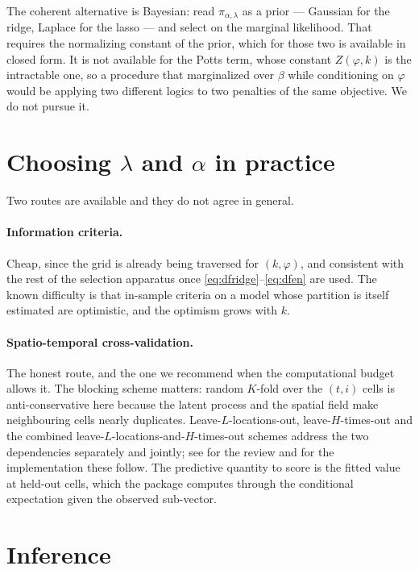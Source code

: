 \documentclass[11pt,a4paper]{article}
\begin{document}
The coherent alternative is Bayesian: read $\pi_{\alpha,\lambda}$ as a prior ---
Gaussian for the ridge, Laplace for the lasso --- and select on the marginal
likelihood. That requires the normalizing constant of the prior, which for
those two is available in closed form. It is not available for the Potts term,
whose constant $Z(\varphi,k)$ is the intractable one, so a procedure that
marginalized over $\beta$ while conditioning on $\varphi$ would be applying two
different logics to two penalties of the same objective. We do not pursue it.

\section{Choosing $\lambda$ and $\alpha$ in practice}

Two routes are available and they do not agree in general.

\paragraph{Information criteria.} Cheap, since the grid is already being
traversed for $(k,\varphi)$, and consistent with the rest of the selection
apparatus once \eqref{eq:dfridge}--\eqref{eq:dfen} are used. The known
difficulty is that in-sample criteria on a model whose partition is itself
estimated are optimistic, and the optimism grows with $k$.

\paragraph{Spatio-temporal cross-validation.} The honest route, and the one we
recommend when the computational budget allows it. The blocking scheme matters:
random $K$-fold over the $(t,i)$ cells is anti-conservative here because the
latent process and the spatial field make neighbouring cells nearly duplicates.
Leave-$L$-locations-out, leave-$H$-times-out and the combined
leave-$L$-locations-and-$H$-times-out schemes address the two dependencies
separately and jointly; see \citet{OttoFassoMaranzano2024} for the review and
\citet{Meyer2018} for the implementation these follow. The predictive quantity
to score is the fitted value at held-out cells, which the package computes
through the conditional expectation given the observed sub-vector.

\section{Inference}
\end{document}
